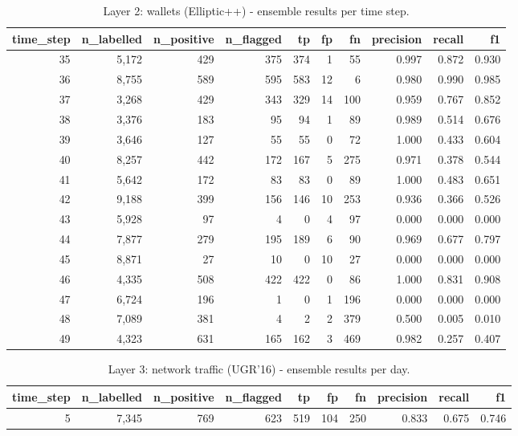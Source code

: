 \begin{table}[t]
\centering
\caption{Layer 2: wallets (Elliptic++) - ensemble results per time step.}
\label{tab:wallet-steps}
\begin{tabular}{rrrrrrrrrr}
\toprule
time\_step & n\_labelled & n\_positive & n\_flagged & tp & fp & fn & precision & recall & f1 \\
\midrule
35 & 5,172 & 429 & 375 & 374 & 1 & 55 & 0.997 & 0.872 & 0.930 \\
36 & 8,755 & 589 & 595 & 583 & 12 & 6 & 0.980 & 0.990 & 0.985 \\
37 & 3,268 & 429 & 343 & 329 & 14 & 100 & 0.959 & 0.767 & 0.852 \\
38 & 3,376 & 183 & 95 & 94 & 1 & 89 & 0.989 & 0.514 & 0.676 \\
39 & 3,646 & 127 & 55 & 55 & 0 & 72 & 1.000 & 0.433 & 0.604 \\
40 & 8,257 & 442 & 172 & 167 & 5 & 275 & 0.971 & 0.378 & 0.544 \\
41 & 5,642 & 172 & 83 & 83 & 0 & 89 & 1.000 & 0.483 & 0.651 \\
42 & 9,188 & 399 & 156 & 146 & 10 & 253 & 0.936 & 0.366 & 0.526 \\
43 & 5,928 & 97 & 4 & 0 & 4 & 97 & 0.000 & 0.000 & 0.000 \\
44 & 7,877 & 279 & 195 & 189 & 6 & 90 & 0.969 & 0.677 & 0.797 \\
45 & 8,871 & 27 & 10 & 0 & 10 & 27 & 0.000 & 0.000 & 0.000 \\
46 & 4,335 & 508 & 422 & 422 & 0 & 86 & 1.000 & 0.831 & 0.908 \\
47 & 6,724 & 196 & 1 & 0 & 1 & 196 & 0.000 & 0.000 & 0.000 \\
48 & 7,089 & 381 & 4 & 2 & 2 & 379 & 0.500 & 0.005 & 0.010 \\
49 & 4,323 & 631 & 165 & 162 & 3 & 469 & 0.982 & 0.257 & 0.407 \\
\bottomrule
\end{tabular}
\end{table}

\begin{table}[t]
\centering
\caption{Layer 3: network traffic (UGR'16) - ensemble results per day.}
\label{tab:network-steps}
\begin{tabular}{rrrrrrrrrr}
\toprule
time\_step & n\_labelled & n\_positive & n\_flagged & tp & fp & fn & precision & recall & f1 \\
\midrule
5 & 7,345 & 769 & 623 & 519 & 104 & 250 & 0.833 & 0.675 & 0.746 \\
\bottomrule
\end{tabular}
\end{table}


